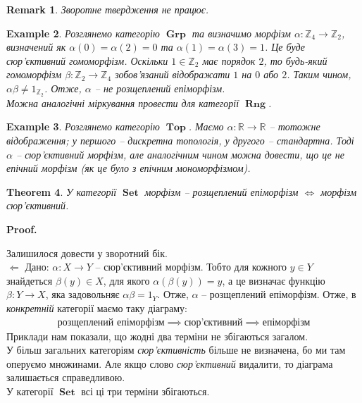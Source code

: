 \documentclass[a4paper, 10pt]{article}
\makeatletter
\def\leftproof{$\boxed{\Leftarrow}$ }
\theoremstyle{theoremdd}
\newtheorem{theorem}{Theorem}[subsection]
\newtheorem{example}[theorem]{Example}
\newtheorem{remark}[theorem]{Remark}
\renewenvironment{proof}[1][Proof.\\]{\par
\pushQED{\hfill \qed}%
\normalfont \topsep6\p@\@plus6\p@\relax
\trivlist
\item\relax
{\bfseries
#1\@addpunct{.}}\hspace\labelsep\ignorespaces
}{%
\popQED\endtrivlist\@endpefalse
}
\DeclareMathOperator{\Set}{\textbf{Set}}
\DeclareMathOperator{\Grp}{\textbf{Grp}}
\DeclareMathOperator{\Rng}{\textbf{Rng}}
\DeclareMathOperator{\Top}{\textbf{Top}}
\makeatother
\begin{document}
\begin{remark}
Зворотне твердження не працює.
\end{remark}

\begin{example}
Розглянемо категорію $\Grp$ та визначимо морфізм $\alpha \colon \mathbb{Z}_4 \to \mathbb{Z}_2$, визначений як $\alpha(0) = \alpha(2) = 0$ та $\alpha(1) = \alpha(3) = 1$. Це буде сюр'єктивний гомоморфізм. Оскільки $1 \in \mathbb{Z}_2$ має порядок $2$, то будь-який гомоморфізм $\beta \colon \mathbb{Z}_2 \to \mathbb{Z}_4$ зобов'язаний відображати $1$ на $0$ або $2$. Таким чином, $\alpha \beta \neq 1_{\mathbb{Z}_2}$. Отже, $\alpha$ -- не розщеплений епіморфізм.
\bigskip \\
Можна аналогічні міркування провести для категорії $\Rng$.
\end{example}

\begin{example}
Розглянемо категорію $\Top$. Маємо $\alpha \colon \mathbb{R} \to \mathbb{R}$ -- тотожне відображення; у першого -- дискретна топологія, у другого -- стандартна. Тоді $\alpha$ -- сюр'єктивний морфізм, але аналогічним чином можна довести, що це не епічний морфізм (як це було з епічним мономорфізмом).
\end{example}

\begin{theorem}
У категорії $\Set$ морфізм -- розщеплений епіморфізм $\iff$ морфізм сюр'єктивний.
\end{theorem}

\begin{proof}
Залишилося довести у зворотний бік.\\
\leftproof Дано: $\alpha \colon X \to Y$ -- сюр'єктивний морфізм. Тобто для кожного $y \in Y$ знайдеться $\beta(y) \in X$, для якого $\alpha(\beta(y)) = y$, а це визначає функцію $\beta \colon Y \to X$, яка задовольняє $\alpha \beta = 1_Y$. Отже, $\alpha$ -- розщеплений епіморфізм.
\end{proof}
\noindent
Отже, в \textit{конкретній} категорії маємо таку діаграму:
\begin{align*}
\text{розщеплений епіморфізм} \implies \textit{сюр'єктивний} \implies \text{епіморфізм}
\end{align*}
Приклади нам показали, що жодні два терміни не збігаються загалом.\\
У більш загальних категоріям \textit{сюр'єктивність} більше не визначена, бо ми там оперуємо множинами. Але якщо слово \textit{сюр'єктивний} видалити, то діаграма залишається справедливою.\\
У категорії $\Set$ всі ці три терміни збігаються.
\end{document}
